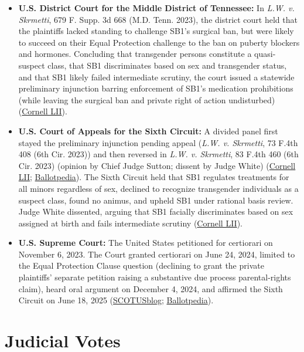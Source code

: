 \documentclass[12pt]{article}
\begin{document}
\begin{itemize}
\item \textbf{U.S. District Court for the Middle District of Tennessee:} In \textit{L.W. v. Skrmetti}, 679 F. Supp. 3d 668 (M.D. Tenn. 2023), the district court held that the plaintiffs lacked standing to challenge SB1's surgical ban, but were likely to succeed on their Equal Protection challenge to the ban on puberty blockers and hormones. Concluding that transgender persons constitute a quasi-suspect class, that SB1 discriminates based on sex and transgender status, and that SB1 likely failed intermediate scrutiny, the court issued a statewide preliminary injunction barring enforcement of SB1's medication prohibitions (while leaving the surgical ban and private right of action undisturbed) (\href{https://www.law.cornell.edu/supremecourt/text/23-477}{Cornell LII}).
\item \textbf{U.S. Court of Appeals for the Sixth Circuit:} A divided panel first stayed the preliminary injunction pending appeal (\textit{L.W. v. Skrmetti}, 73 F.4th 408 (6th Cir. 2023)) and then reversed in \textit{L.W. v. Skrmetti}, 83 F.4th 460 (6th Cir. 2023) (opinion by Chief Judge Sutton; dissent by Judge White) (\href{https://www.law.cornell.edu/supremecourt/text/23-477}{Cornell LII}; \href{https://ballotpedia.org/United_States_v._Skrmetti}{Ballotpedia}). The Sixth Circuit held that SB1 regulates treatments for all minors regardless of sex, declined to recognize transgender individuals as a suspect class, found no animus, and upheld SB1 under rational basis review. Judge White dissented, arguing that SB1 facially discriminates based on sex assigned at birth and fails intermediate scrutiny (\href{https://www.law.cornell.edu/supremecourt/text/23-477}{Cornell LII}).
\item \textbf{U.S. Supreme Court:} The United States petitioned for certiorari on November 6, 2023. The Court granted certiorari on June 24, 2024, limited to the Equal Protection Clause question (declining to grant the private plaintiffs' separate petition raising a substantive due process parental-rights claim), heard oral argument on December 4, 2024, and affirmed the Sixth Circuit on June 18, 2025 (\href{https://www.scotusblog.com/cases/united-states-v-skrmetti/}{SCOTUSblog}; \href{https://ballotpedia.org/United_States_v._Skrmetti}{Ballotpedia}).
\end{itemize}

\section{Judicial Votes}
\end{document}
